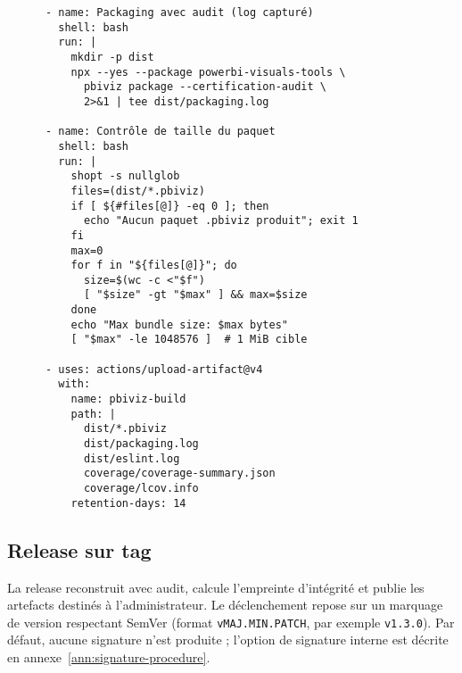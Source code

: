 \begin{verbatim}
      - name: Packaging avec audit (log capturé)
        shell: bash
        run: |
          mkdir -p dist
          npx --yes --package powerbi-visuals-tools \
            pbiviz package --certification-audit \
            2>&1 | tee dist/packaging.log

      - name: Contrôle de taille du paquet
        shell: bash
        run: |
          shopt -s nullglob
          files=(dist/*.pbiviz)
          if [ ${#files[@]} -eq 0 ]; then
            echo "Aucun paquet .pbiviz produit"; exit 1
          fi
          max=0
          for f in "${files[@]}"; do
            size=$(wc -c <"$f")
            [ "$size" -gt "$max" ] && max=$size
          done
          echo "Max bundle size: $max bytes"
          [ "$max" -le 1048576 ]  # 1 MiB cible

      - uses: actions/upload-artifact@v4
        with:
          name: pbiviz-build
          path: |
            dist/*.pbiviz
            dist/packaging.log
            dist/eslint.log
            coverage/coverage-summary.json
            coverage/lcov.info
          retention-days: 14
\end{verbatim}

\subsection{Release sur tag}
\label{subsec:ci-release}

La release reconstruit avec audit, calcule l’empreinte d’intégrité et publie les artefacts destinés à l’administrateur. Le déclenchement repose sur un marquage de version respectant SemVer (format \texttt{vMAJ.MIN.PATCH}, par exemple \texttt{v1.3.0}). Par défaut, aucune signature n’est produite ; l’option de signature interne est décrite en annexe~\ref{ann:signature-procedure}.

